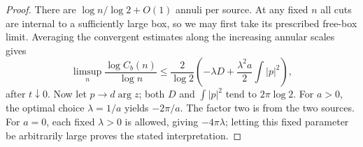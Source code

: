 \begin{proof}
There are \(\log n/\log2+O(1)\) annuli per source.
At any fixed \(n\) all cuts are internal to a sufficiently
large box, so we may first take its prescribed free-box
limit. Averaging the convergent estimates along the
increasing annular scales gives
\[
 \limsup_n\frac{\log C_b(n)}{\log n}
 \le\frac{2}{\log2}
       \left(-\lambda D+\frac{\lambda^2a}{2}\int|p|^2\right),
\]
after \(t\downarrow0\).
Now let \(p\to d\arg z\); both \(D\) and
\(\int|p|^2\) tend to \(2\pi\log2\).
For \(a>0\), the optimal choice \(\lambda=1/a\) yields
\(-2\pi/a\). The factor two is from the two sources.
For \(a=0\), each fixed \(\lambda>0\) is allowed, giving
\(-4\pi\lambda\); letting this fixed parameter be arbitrarily
large proves the stated interpretation.
\end{proof}
